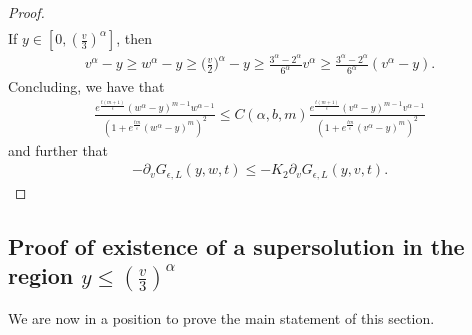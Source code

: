 \documentclass[11pt]{article}
\numberwithin{equation}{section}
\begin{document}
\begin{proof}
\begin{align*}
 \end{align*}
 If $y\in[0,(\frac{v}{3})^{\alpha}]$, then
  \begin{align*}
  v^{\alpha}-y\geq w^{\alpha}-y\geq     \Big(\frac{v}{2}\Big)^{\alpha}-y\geq \frac{3^{\alpha}-2^{\alpha}}{6^{\alpha}}v^{\alpha}\geq  \frac{3^{\alpha}-2^{\alpha}}{6^{\alpha}}(v^{\alpha}-y).
 \end{align*}
 Concluding, we have that
 \begin{align*}
            \frac{e^{\frac{t(m+1)}{\epsilon}}(w^{\alpha}-y)^{m-1}w^{\alpha-1}}{(1+e^{\frac{tm}{\epsilon}}(w^{\alpha}-y)^{m})^{2}}\leq C(\alpha,b,m) \frac{e^{\frac{t(m+1)}{\epsilon}}(v^{\alpha}-y)^{m-1}v^{\alpha-1}}{(1+e^{\frac{tm}{\epsilon}}(v^{\alpha}-y)^{m})^{2}}
 \end{align*}
 and further that
 \begin{align*}
     -\partial_{v}G_{\epsilon,L}(y,w,t)\leq  -K_{2}\partial_{v}G_{\epsilon,L}(y,v,t).
 \end{align*}
 \end{proof}
 \subsection{Proof of existence of a supersolution in the region $y\leq (\frac{v}{3})^{\alpha}$}\label{subsection approximation}
 We are now in a position to prove the main statement of this section.
\end{document}

